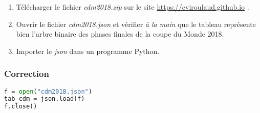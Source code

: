 \documentclass[svgnames,11pt]{beamer}
\begin{document}
\begin{frame}
    \frametitle{}

    \begin{activite}
        \begin{enumerate}
            \item Télécharger le fichier \emph{cdm2018.zip} sur le site \url{https://cviroulaud.github.io} .
            \item Ouvrir le fichier \emph{cdm2018.json} et vérifier \emph{à la main} que le tableau représente bien l'arbre binaire des phases finales de la coupe du Monde 2018.
            \item Importer le \emph{json} dans un programme Python.
        \end{enumerate}
    \end{activite}

\end{frame}
\begin{frame}[fragile]
    \frametitle{Correction}

\begin{center}
\begin{lstlisting}[language=Python , basicstyle=\ttfamily\small, xleftmargin=2em, xrightmargin=2em]
f = open("cdm2018.json")
tab_cdm = json.load(f)
f.close()
\end{lstlisting}
\label{CODE}
\end{center}

\end{frame}
\end{document}
